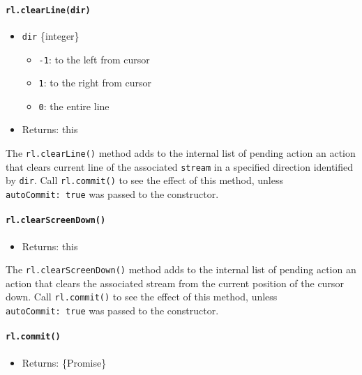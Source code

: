 \paragraph{\texorpdfstring{\texttt{rl.clearLine(dir)}}{rl.clearLine(dir)}}\label{rl.clearlinedir}

\begin{itemize}
\tightlist
\item
  \texttt{dir} \{integer\}

  \begin{itemize}
  \tightlist
  \item
    \texttt{-1}: to the left from cursor
  \item
    \texttt{1}: to the right from cursor
  \item
    \texttt{0}: the entire line
  \end{itemize}
\item
  Returns: this
\end{itemize}

The \texttt{rl.clearLine()} method adds to the internal list of pending
action an action that clears current line of the associated
\texttt{stream} in a specified direction identified by \texttt{dir}.
Call \texttt{rl.commit()} to see the effect of this method, unless
\texttt{autoCommit:\ true} was passed to the constructor.

\paragraph{\texorpdfstring{\texttt{rl.clearScreenDown()}}{rl.clearScreenDown()}}\label{rl.clearscreendown}

\begin{itemize}
\tightlist
\item
  Returns: this
\end{itemize}

The \texttt{rl.clearScreenDown()} method adds to the internal list of
pending action an action that clears the associated stream from the
current position of the cursor down. Call \texttt{rl.commit()} to see
the effect of this method, unless \texttt{autoCommit:\ true} was passed
to the constructor.

\paragraph{\texorpdfstring{\texttt{rl.commit()}}{rl.commit()}}\label{rl.commit}

\begin{itemize}
\tightlist
\item
  Returns: \{Promise\}
\end{itemize}

